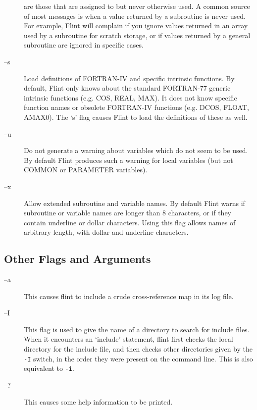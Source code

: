 \begin{description}
are those that are assigned to but never otherwise used. A common
source of most messages is when a value returned by a subroutine
is never used. For example, Flint will complain if you ignore values
returned in an array used by a subroutine for scratch storage, or if values
returned by a general subroutine are ignored in specific cases.
\item[--s] Load definitions of FORTRAN-IV and specific intrinsic functions.
By default, Flint only knows about the standard FORTRAN-77 generic intrinsic
functions (e.g. COS, REAL, MAX). It does not know specific function names
or obsolete FORTRAN-IV functions (e.g. DCOS, FLOAT, AMAX0). The `s'
flag causes Flint to load the definitions of these as well.
\item[--u] Do not generate a warning about variables which do not seem to be
used. By default Flint produces such a warning for local variables (but
not COMMON or PARAMETER variables).
\item[--x] Allow extended subroutine and variable names. By default Flint
warns if subroutine or variable names are longer than 8 characters, or if
they contain underline or dollar characters. Using this flag
allows names of arbitrary length, with dollar and underline characters.
\end{description}

\subsection{Other Flags and Arguments}
\begin{description}
\item[--a] This causes flint to include a crude cross-reference map in its
log file.
\item[--I] This flag is used to give the name of a directory to search for
include files. When it encounters an `include' statement, flint first checks
the local directory for the include file, and then checks other
directories given by the {\tt -I} switch, in the order they were present
on the command line. This is also equivalent to {\tt -i}.
\item[--?] This causes some help information to be printed.
\end{description}

